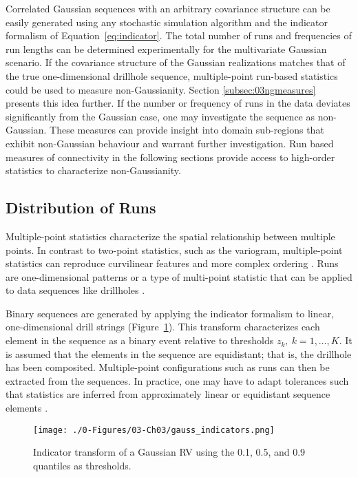 Correlated Gaussian sequences with an arbitrary covariance structure can be easily generated using any stochastic simulation algorithm and the indicator formalism of Equation~\ref{eq:indicator}. The total number of runs and frequencies of run lengths can be determined experimentally for the multivariate Gaussian scenario. If the covariance structure of the Gaussian realizations matches that of the true one-dimensional drillhole sequence, multiple-point run-based statistics could be used to measure non-Gaussianity. Section \ref{subsec:03ngmeasures} presents this idea further. If the number or frequency of runs in the data deviates significantly from the Gaussian case, one may investigate the sequence as non-Gaussian. These measures can provide insight into domain sub-regions that exhibit non-Gaussian behaviour and warrant further investigation. Run based measures of connectivity in the following sections provide access to high-order statistics to characterize non-Gaussianity.

\FloatBarrier
\subsection{Distribution of Runs}
\label{subsec:03runs}

Multiple-point statistics characterize the spatial relationship between multiple points. In contrast to two-point statistics, such as the variogram, multiple-point statistics can reproduce curvilinear features and more complex ordering \citep{guardiano1993multivariate}. Runs are one-dimensional patterns or a type of multi-point statistic that can be applied to data sequences like drillholes \citep{boisvert2007multiplepoint}.

Binary sequences are generated by applying the indicator formalism to linear, one-dimensional drill strings (Figure~\ref{fig:gauss_indicators}). This transform characterizes each element in the sequence as a binary event relative to thresholds $z_{k}, \ k=1,\dots,K$. It is assumed that the elements in the sequence are equidistant; that is, the drillhole has been composited. Multiple-point configurations such as runs can then be extracted from the sequences. In practice, one may have to adapt tolerances such that statistics are inferred from approximately linear or equidistant sequence elements \citep{ortiz2003characterization}.

\begin{figure}[htb!]
    \centering
    \texttt{[image: ./0-Figures/03-Ch03/gauss\_indicators.png]}
    \caption{Indicator transform of a Gaussian \gls{RV} using the 0.1, 0.5, and 0.9 quantiles as thresholds. }
    \label{fig:gauss_indicators}
\end{figure}


